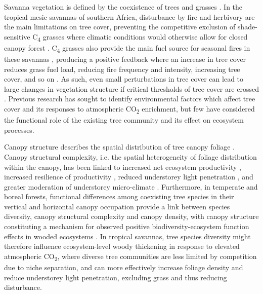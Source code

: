 \documentclass[11pt,a4paper]{article}
\begin{document}
Savanna vegetation is defined by the coexistence of trees and grasses \citep{Scholes1997}. In the tropical mesic savannas of southern Africa, disturbance by fire and herbivory are the main limitations on tree cover, preventing the competitive exclusion of shade-sensitive C\textsubscript{4} grasses where climatic conditions would otherwise allow for closed canopy forest \citep{Sankaran2005}. C\textsubscript{4} grasses also provide the main fuel source for seasonal fires in these savannas \citep{Frost1996}, producing a positive feedback where an increase in tree cover reduces grass fuel load, reducing fire frequency and intensity, increasing tree cover, and so on \citep{Staver2015}. As such, even small perturbations in tree cover can lead to large changes in vegetation structure if critical thresholds of tree cover are crossed \citep{Hirota2011}. Previous research has sought to identify environmental factors which affect tree cover and its responses to atmospheric CO\textsubscript{2} enrichment, but few have considered the functional role of the existing tree community and its effect on ecosystem processes.

Canopy structure describes the spatial distribution of tree canopy foliage \citep{Lowman2004}. Canopy structural complexity, i.e. the spatial heterogeneity of foliage distribution within the canopy, has been linked to increased net ecosystem productivity \citep{Hardiman2011,Chen2012,Law2001,Baldocchi2001,Morin2015}, increased resilience of productivity \citep{Pretzsch2014}, reduced understorey light penetration \citep{Scheuermann2018, Fotis2018}, and greater moderation of understorey micro-climate \citep{Wright2017}. Furthermore, in temperate and boreal forests, functional differences among coexisting tree species in their vertical and horizontal canopy occupation provide a link between species diversity, canopy structural complexity and canopy density, with canopy structure constituting a mechanism for observed positive biodiversity-ecosystem function effects in wooded ecosystems \citep{Pretzsch2014, Barry2019}. In tropical savannas, tree species diversity might therefore influence ecosystem-level woody thickening in response to elevated atmospheric CO\textsubscript{2}, where diverse tree communities are less limited by competition due to niche separation, and can more effectively increase foliage density and reduce understorey light penetration, excluding grass and thus reducing disturbance. 
\end{document}
